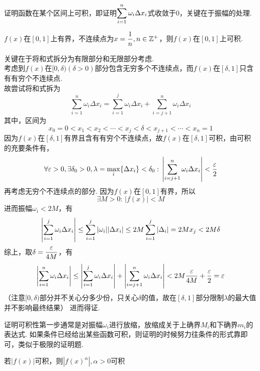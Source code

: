 \par 证明函数在某个区间上可积，即证明$\displaystyle\sum_{i=1}^n\omega_i\Delta x_i$式收敛于$0$，关键在于振幅的处理.
\begin{example}
$f(x)$在$[0,1]$上有界，不连续点为$x=\dfrac{1}{n},n\in\mathbb{Z}^+$，则$f(x)$在$[0,1]$上可积.
\end{example}
\begin{analysis}
关键在于将和式拆分为有限部分和无限部分考虑.\\
考虑到$f(x)$在$[0,\delta)(\delta>0)$部分包含无穷多个不连续点，而$f(x)$在$[\delta,1]$只含有有穷个不连续点.\\
故尝试将和式拆为
\[\sum_{i=1}^n\omega_i\Delta x_i=\sum_{i=1}^j\omega_i\Delta x_i+\sum_{i=j+1}^n\omega_i\Delta x_i\]
其中，区间为
\[x_0=0<x_1<x_2<\cdots<x_j<\delta<x_{j+1}<\cdots<x_n=1\]
因为$f(x)$在$[\delta,1]$有界且含有有穷个不连续点，故$f(x)$在$[\delta,1]$可积，由可积的充要条件有，
\[\forall\varepsilon>0,\exists\delta_0>0,\lambda=\max_i\{\Delta x_i\}<\delta_0:\,\left|\sum_{i=j+1}^n\omega_i\Delta x_i\right|<\dfrac{\varepsilon}{2}\]
再考虑无穷个不连续点的部分. 因为$f(x)$在$[0,1]$有界，所以
\[\exists M>0:\,|f(x)|<M\]
进而振幅$\omega_i<2M$，有
\[\left|\sum_{i=1}^j\omega_i\Delta x_i\right|\leq\sum_{i=1}^j|\omega_i||\Delta x_i|\leq 2M\sum_{i=1}^j|\Delta_i|=2Mx_j<2M\delta\]
综上，取$\delta=\dfrac{\varepsilon}{4M}$，有
\[\left|\sum_{i=1}^n\omega_i\Delta x_i\right|\leq\left|\sum_{i=1}^j\omega_i\Delta x_i\right|+\left|\sum_{i=j+1}^n\omega_i\Delta x_i\right|<2M\dfrac{\varepsilon}{4M}+\dfrac{\varepsilon}{2}=\varepsilon\]
（注意$[0,\delta)$部分并不关心分多少份，只关心$\delta$的值，故在$[\delta,1]$部分限制$\lambda$的最大值并不影响最终结果）
进而得证.
\end{analysis}
\par 证明可积性第一步通常是对振幅$\omega_i$进行放缩，放缩成关于上确界$M_i$和下确界$m_i$的表达式.
如果条件已经给出某些函数可积，则证明的时候努力往条件的形式靠即可，类似于极限的证明题.
\begin{example}
\label{ex:f_f2_absf_relation_lemma}
若$|f(x)|$可积，则$|f(x)^\alpha|,\alpha>0$可积
\end{example}
